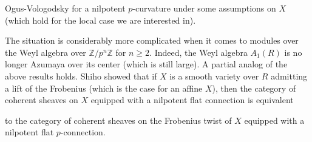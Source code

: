 \documentclass[12pt,letterpaper]{amsart}
\theoremstyle{plain}
\theoremstyle{definition}
\begin{document}
Ogus-Vologodsky \cite{OV} for a nilpotent $p$-curvature under some assumptions on $X$
(which hold for the local case we are interested in).


The situation is considerably more complicated when it comes to modules over the Weyl algebra over 
$\mathbb{Z}/p^n\mathbb{Z}$ for $n\geq 2$.  Indeed, the Weyl algebra $A_1(R)$ is no longer Azumaya over its center (which is still large).
A partial analog of the above results holds. Shiho \cite{S} showed that if $X$ is a smooth variety over $R$ admitting a lift of the Frobenius (which is the case for an affine $X$), then the category of coherent sheaves on $X$ equipped with a nilpotent flat connection is equivalent

to the category of coherent sheaves on the Frobenius twist of $X$ equipped with a nilpotent flat $p$-connection.
\end{document}
